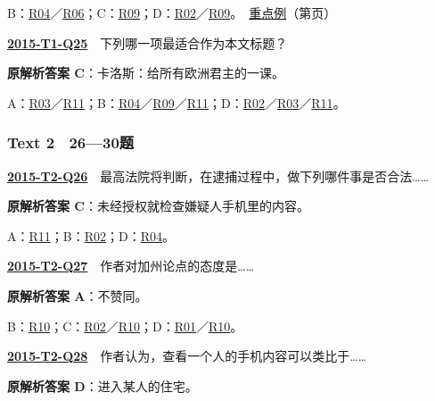 \documentclass[11pt,a4paper]{article}
\begin{document}
\noindent B：\hyperref[cat-R04]{R04}／\hyperref[cat-R06]{R06}；C：\hyperref[cat-R09]{R09}；D：\hyperref[cat-R02]{R02}／\hyperref[cat-R09]{R09}。　\hyperref[case-2015-T1-Q24]{重点例}（第\pageref{case-2015-T1-Q24}页）\par\smallskip
{}\label{idx-2015-T1-Q25}\noindent\textbf{\href{https://zj139.github.io/math-notes/english/bd84b09056a8e650262124b0/\#q25}{2015-T1-Q25}}　下列哪一项最适合作为本文标题？\par\nopagebreak
\noindent\textbf{原解析答案 C}：卡洛斯：给所有欧洲君主的一课。\par\nopagebreak
\noindent A：\hyperref[cat-R03]{R03}／\hyperref[cat-R11]{R11}；B：\hyperref[cat-R04]{R04}／\hyperref[cat-R09]{R09}／\hyperref[cat-R11]{R11}；D：\hyperref[cat-R02]{R02}／\hyperref[cat-R03]{R03}／\hyperref[cat-R11]{R11}。\par\smallskip
{}\subsubsection{Text 2　26—30题}
\label{idx-2015-T2-Q26}\noindent\textbf{\href{https://zj139.github.io/math-notes/english/1d136f1c0a2cc3e255b39ab4/\#q26}{2015-T2-Q26}}　最高法院将判断，在逮捕过程中，做下列哪件事是否合法……\par\nopagebreak
\noindent\textbf{原解析答案 C}：未经授权就检查嫌疑人手机里的内容。\par\nopagebreak
\noindent A：\hyperref[cat-R11]{R11}；B：\hyperref[cat-R02]{R02}；D：\hyperref[cat-R04]{R04}。\par\smallskip
{}\label{idx-2015-T2-Q27}\noindent\textbf{\href{https://zj139.github.io/math-notes/english/1d136f1c0a2cc3e255b39ab4/\#q27}{2015-T2-Q27}}　作者对加州论点的态度是……\par\nopagebreak
\noindent\textbf{原解析答案 A}：不赞同。\par\nopagebreak
\noindent B：\hyperref[cat-R10]{R10}；C：\hyperref[cat-R02]{R02}／\hyperref[cat-R10]{R10}；D：\hyperref[cat-R01]{R01}／\hyperref[cat-R10]{R10}。\par\smallskip
{}\label{idx-2015-T2-Q28}\noindent\textbf{\href{https://zj139.github.io/math-notes/english/1d136f1c0a2cc3e255b39ab4/\#q28}{2015-T2-Q28}}　作者认为，查看一个人的手机内容可以类比于……\par\nopagebreak
\noindent\textbf{原解析答案 D}：进入某人的住宅。\par\nopagebreak
\end{document}
